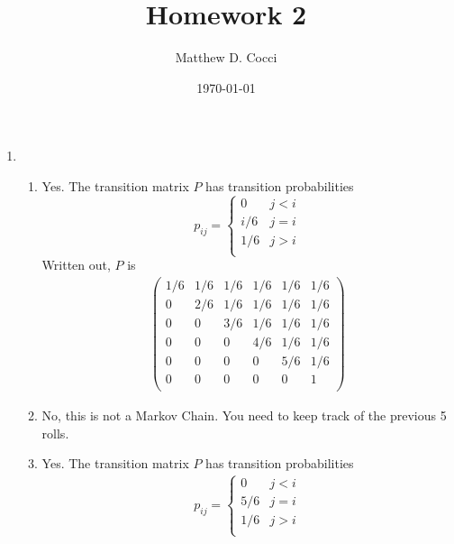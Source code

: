 \documentclass[12pt]{article}
\author{Matthew D. Cocci}
\title{Homework 2}
\date{\today}
\theoremstyle{plain}
\theoremstyle{definition}
\theoremstyle{remark}
\begin{document}
\maketitle


\begin{enumerate}

\item %
\begin{enumerate}
  \item %
    Yes. The transition matrix $P$ has transition probabilities
    \begin{equation}
      p_{ij} = 
        \begin{cases}
          0 & j < i\\
          i/6 & j = i\\
          1/6 & j > i\\
        \end{cases}
    \end{equation}
    Written out, $P$ is
    \begin{align*}
      \begin{pmatrix}
        1/6 & 1/6 & 1/6 & 1/6 & 1/6 & 1/6 \\
        0   & 2/6 & 1/6 & 1/6 & 1/6 & 1/6 \\
        0   & 0   & 3/6 & 1/6 & 1/6 & 1/6 \\
        0   & 0   & 0   & 4/6 & 1/6 & 1/6 \\
        0   & 0   & 0   & 0   & 5/6 & 1/6 \\
        0   & 0   & 0   & 0   & 0   & 1 \\
      \end{pmatrix}
    \end{align*}

  \item %
    No, this is not a Markov Chain. You need to keep track of the
    previous 5 rolls. 

  \item %
    Yes. The transition matrix $P$ has transition probabilities
    \begin{align*}
      p_{ij} = 
        \begin{cases}
          0 & j < i\\
          5/6 & j = i\\
          1/6 & j > i\\
        \end{cases}
    \end{align*}


\end{enumerate}
\end{enumerate}
\end{document}
